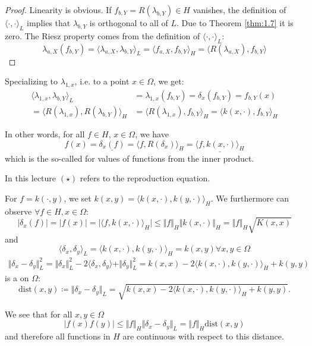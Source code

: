 \begin{proof}
    Linearity is obvious. If $f_{b,Y}=R(\lambda_{b,Y})\in H$ vanishes, the definition of 
    $\langle\cdot,\cdot\rangle_L$ implies that $\lambda_{b,Y}$ is orthogonal to all of $L$. Due to Theorem \ref{thm:1.7} it is zero.
    The Riesz property comes from the definition of $\langle\cdot,\cdot\rangle_L$:
    \[\lambda_{a,X}(f_{b,Y})=\langle \lambda_{a,X},\lambda_{b,Y}\rangle_L=\langle f_{a,X},f_{b,Y}\rangle_H=\langle R(\lambda_{a,X}),f_{b,Y}\rangle\]
\end{proof}

Specializing to $\lambda_{1,x}$, i.e. to a point $x\in \Omega$, we get:
\begin{align*}
    \langle \lambda_{1,x},\lambda_{b,Y}\rangle_L&=\lambda_{1,x}(f_{b,Y})=\delta_x(f_{b,Y})=f_{b,Y}(x)\\
    =\langle R(\lambda_{1,x}),R(\lambda_{b,Y})\rangle_H&=\langle R(\lambda_{1,x}),f_{b,Y}\rangle_H=\langle k(x,\cdot),f_{b,Y}\rangle_H
\end{align*}

In other words, for all $f\in H$, $x\in \Omega$, we have 
\[f(x)=\underline{\delta_x(f)}=\langle f, R(\delta_x)\rangle_H=\underline{\langle f,k(x,\cdot)\rangle_H}\]
which is the so-called  for values of functions from the inner product.


\begin{aremark}
    In this lecture $(\star)$ refers to the reproduction equation.
\end{aremark}

For $f=k(\cdot,y)$, we set $k(x,y)=\langle k(x,\cdot),k(y,\cdot)\rangle_H$.
We furthermore can observe $\forall f\in H,x\in\Omega$:
\[\vert \delta_x(f)\vert=\vert f(x)\vert=\vert \langle f,k(x,\cdot)\rangle_H\vert\leq \Vert f\Vert_H\Vert k(x,\cdot)\Vert_H=\Vert f\Vert_H \sqrt{K(x,x)}\]
and 
\[\langle \delta_x,\delta_y\rangle_L=\langle k(x,\cdot),k(y,\cdot)\rangle_H=k(x,y)\forall x,y\in \Omega\]
\begin{align*}
    \Vert \delta_x-\delta_y\Vert_L^2=\Vert \delta_x\Vert_L^2-2\langle \delta_x,\delta_y\rangle+\Vert \delta_y\Vert_L^2=k(x,x)-2\langle k(x,\cdot),k(y,\cdot)\rangle_H+k(y,y)
\end{align*}
is a  on $\Omega$:
\[\text{dist}(x,y)\coloneqq \Vert \delta_x-\delta_y\Vert_L=\sqrt{k(x,x)-2\langle k(x,\cdot),k(y,\cdot)\rangle_H+k(y,y)}.\]

We see that for all $x,y\in\Omega$
\[\vert f(x)f(y)\vert\leq \Vert f\Vert_H\Vert\delta_x-\delta_y\Vert_L=\Vert f\Vert_H\text{dist}(x,y)\]
and therefore all functions in $H$ are continuous with respect to this distance.

